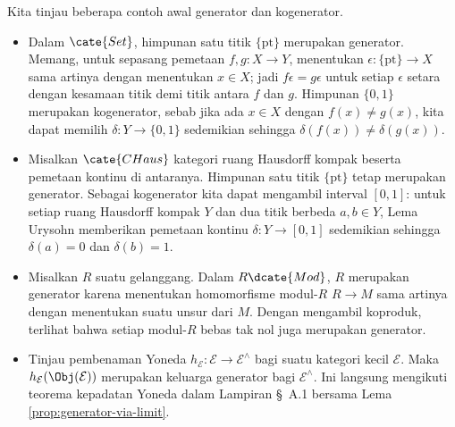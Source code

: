 \begin{contoh}\label{eg:generators}
	Kita tinjau beberapa contoh awal generator dan kogenerator.
	\begin{itemize}
		\item Dalam $\cate{Set}$, himpunan satu titik $\{\mathrm{pt}\}$
		merupakan generator. Memang, untuk sepasang pemetaan $f,g:X\to Y$,
		menentukan $\epsilon:\{\mathrm{pt}\}\to X$ sama artinya dengan
		menentukan $x\in X$; jadi $f\epsilon=g\epsilon$ untuk setiap
		$\epsilon$ setara dengan kesamaan titik demi titik antara $f$ dan $g$.
		Himpunan $\{0,1\}$ merupakan kogenerator, sebab jika ada $x\in X$
		dengan $f(x)\neq g(x)$, kita dapat memilih $\delta:Y\to\{0,1\}$
		sedemikian sehingga $\delta(f(x))\neq\delta(g(x))$.

		\item Misalkan $\cate{CHaus}$ kategori ruang Hausdorff kompak beserta
		pemetaan kontinu di antaranya. Himpunan satu titik
		$\{\mathrm{pt}\}$ tetap merupakan generator. Sebagai kogenerator kita
		dapat mengambil interval $[0,1]$: untuk setiap ruang Hausdorff kompak
		$Y$ dan dua titik berbeda $a,b\in Y$, Lema Urysohn
		\cite[Teorema 6.3.1 dan Korolari 7.2.6]{Xiong} memberikan pemetaan kontinu
		$\delta:Y\to[0,1]$ sedemikian sehingga $\delta(a)=0$ dan
		$\delta(b)=1$.

		\item Misalkan $R$ suatu gelanggang. Dalam $R\dcate{Mod}$, $R$
		merupakan generator karena menentukan homomorfisme modul-$R$
		$R\to M$ sama artinya dengan menentukan suatu unsur dari $M$. Dengan
		mengambil koproduk, terlihat bahwa setiap modul-$R$ bebas tak nol juga
		merupakan generator.

		\item Tinjau pembenaman Yoneda
		$h_{\mathcal{E}}:\mathcal{E}\to\mathcal{E}^\wedge$ bagi suatu kategori
		kecil $\mathcal{E}$. Maka
		$h_{\mathcal{E}}(\Obj(\mathcal{E}))$ merupakan keluarga generator bagi
		$\mathcal{E}^\wedge$. Ini langsung mengikuti
		teorema kepadatan Yoneda dalam Lampiran \S~A.1 bersama Lema
		\ref{prop:generator-via-limit}.
	\end{itemize}
\end{contoh}

